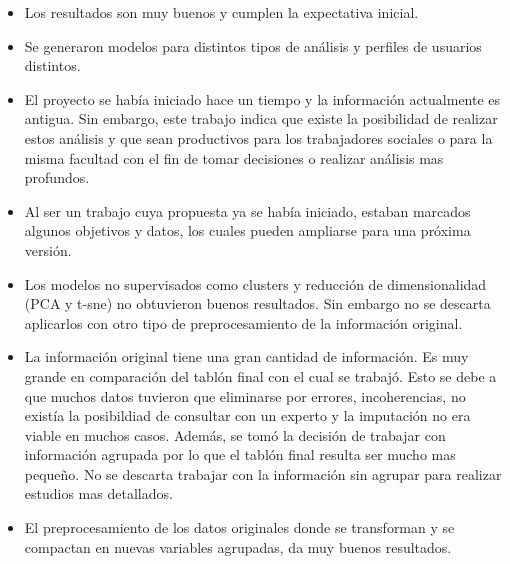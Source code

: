 \begin{itemize}
	\item 
	Los resultados son muy buenos y cumplen la expectativa inicial.
	\item 
	Se generaron modelos para distintos tipos de análisis y perfiles de usuarios distintos.
	\item 
	El proyecto se había iniciado hace un tiempo y la información actualmente es antigua. Sin embargo, este trabajo indica que existe la posibilidad de realizar estos análisis y que sean productivos para los trabajadores sociales o para la misma facultad con el fin de tomar decisiones o realizar análisis mas profundos.
	\item 
	Al ser un trabajo cuya propuesta ya se había iniciado, estaban marcados algunos objetivos y datos, los cuales pueden ampliarse para una próxima versión.
	\item 
	Los modelos no supervisados como clusters y reducción de dimensionalidad (PCA y t-sne) no obtuvieron buenos resultados. Sin embargo no se descarta aplicarlos con otro tipo de preprocesamiento de la información original.
	\item 
	La información original tiene una gran cantidad de información. Es muy grande en comparación del tablón final con el cual se trabajó. Esto se debe a que muchos datos tuvieron que eliminarse por errores, incoherencias, no existía la posibildiad de consultar con un experto y la imputación no era viable en muchos casos. Además, se tomó la decisión de trabajar con información agrupada por lo que el tablón final resulta ser mucho mas pequeño. No se descarta trabajar con la información sin agrupar para realizar estudios mas detallados.
	\item 
	El preprocesamiento de los datos originales donde se transforman y se compactan en nuevas variables agrupadas, da muy buenos resultados.
\end{itemize}
